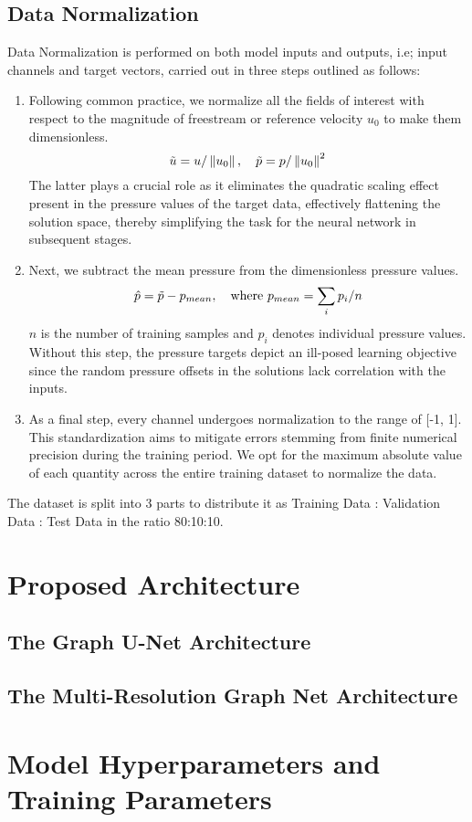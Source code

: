 \subsection{Data Normalization}
Data Normalization is performed on both model inputs and outputs, i.e; input channels and target vectors, carried out in three steps outlined as follows: 
\begin{enumerate}
\item Following common practice, we normalize all the fields of interest with respect to the magnitude of freestream or reference velocity $u_0$ to make them dimensionless. \begin{equation}
    \Tilde{u}=u /\left\|u_0\right\|, \quad \Tilde{p}=p /\left\|u_0\right\|^2
    \end{equation}
The latter plays a crucial role as it eliminates the quadratic scaling effect present in the pressure values of the target data, effectively flattening the solution space, thereby simplifying the task for the neural network in subsequent stages.
\item Next, we subtract the mean pressure from the dimensionless pressure values. 
\begin{equation}
\hat{p} = \Tilde{p} - p_{mean} , \quad \text{where } p_{mean} = \sum_i p_i / n
\end{equation}
$n$ is the number of training samples and $p_i$ denotes individual pressure values. Without this step, the pressure targets depict an ill-posed learning objective since the random pressure offsets in the solutions lack correlation with the inputs.
\item As a final step, every channel undergoes normalization to the range of [-1, 1]. This standardization aims to mitigate errors stemming from finite numerical precision during the training period. We opt for the maximum absolute value of each quantity across the entire training dataset to normalize the data. 
\end{enumerate}
The dataset is split into 3 parts to distribute it as Training Data : Validation Data : Test Data in the ratio 80:10:10. 
\section{Proposed Architecture}
 
\subsection{The Graph U-Net Architecture}
\subsection{The Multi-Resolution Graph Net Architecture}
\section{Model Hyperparameters and Training Parameters}

